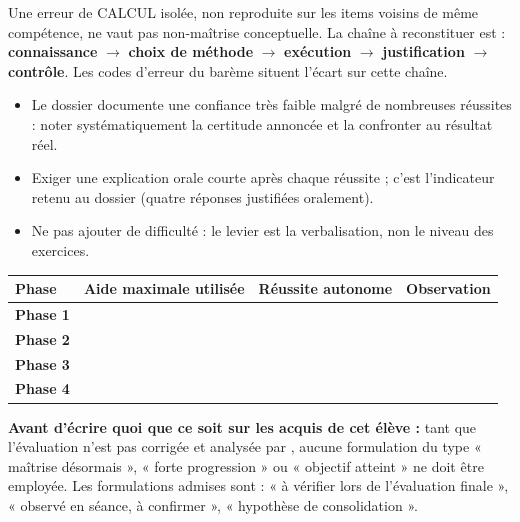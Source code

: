 \documentclass[10pt,a4paper]{article}
\begin{document}
Une erreur de \textsc{CALCUL} isolée, non reproduite sur les items voisins de même compétence, ne vaut pas non-maîtrise conceptuelle. La chaîne à reconstituer est : \textbf{connaissance} $\rightarrow$ \textbf{choix de méthode} $\rightarrow$ \textbf{exécution} $\rightarrow$ \textbf{justification} $\rightarrow$ \textbf{contrôle}. Les codes d'erreur du barème situent l'écart sur cette chaîne.
\begin{itemize}\item Le dossier documente une confiance très faible malgré de nombreuses réussites : noter systématiquement la certitude annoncée et la confronter au résultat réel.\item Exiger une explication orale courte après chaque réussite ; c'est l'indicateur retenu au dossier (quatre réponses justifiées oralement).\item Ne pas ajouter de difficulté : le levier est la verbalisation, non le niveau des exercices.\end{itemize}
\par\noindent\begin{tabularx}{\linewidth}{>{\bfseries}p{26mm} X X X}
\toprule Phase & Aide maximale utilisée & Réussite autonome & Observation \\ \midrule
Phase 1 & & & \\[6mm]
Phase 2 & & & \\[6mm]
Phase 3 & & & \\[6mm]
Phase 4 & & & \\[6mm]
\bottomrule\end{tabularx}
\begin{warningbox}\textbf{Avant d'écrire quoi que ce soit sur les acquis de cet élève :} tant que l'évaluation n'est pas corrigée et analysée par , aucune formulation du type « maîtrise désormais », « forte progression » ou « objectif atteint » ne doit être employée. Les formulations admises sont : « à vérifier lors de l'évaluation finale », « observé en séance, à confirmer », « hypothèse de consolidation ».\end{warningbox}
\end{document}
